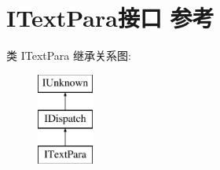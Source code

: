 \hypertarget{interface_i_text_para}{}\section{I\+Text\+Para接口 参考}
\label{interface_i_text_para}
类 I\+Text\+Para 继承关系图\+:\begin{figure}[H]
\begin{center}
\leavevmode
\includegraphics[height=3.000000cm]{interface_i_text_para}
\end{center}
\end{figure}
